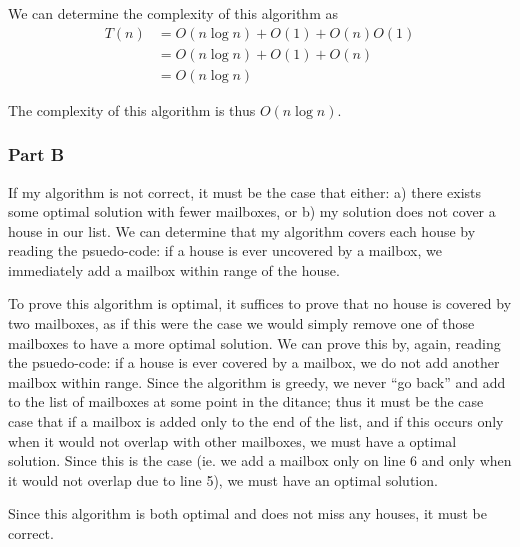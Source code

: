 \documentclass[12pt]{article}
\begin{document}
We can determine the complexity of this algorithm as
\begin{align*}
T(n) &= O(n\log n) + O(1) + O(n)O(1) \\
&= O(n\log n) + O(1) + O(n) \\
&= O(n\log n)
\end{align*}

The complexity of this algorithm is thus $O(n\log n)$.

\subsubsection*{Part B}
If my algorithm is not correct, it must be the case that either: a) there exists some optimal solution with fewer mailboxes, or b) my solution does not cover a house in our list. We can determine that my algorithm covers each house by reading the psuedo-code: if a house is ever uncovered by a mailbox, we immediately add a mailbox within range of the house.

To prove this algorithm is optimal, it suffices to prove that no house is covered by two mailboxes, as if this were the case we would simply remove one of those mailboxes to have a more optimal solution. We can prove this by, again, reading the psuedo-code: if a house is ever covered by a mailbox, we do not add another mailbox within range. Since the algorithm is greedy, we never ``go back'' and add to the list of mailboxes at some point in the ditance; thus it must be the case case that if a mailbox is added only to the end of the list, and if this occurs only when it would not overlap with other mailboxes, we must have a optimal solution. Since this is the case (ie. we add a mailbox only on line 6 and only when it would not overlap due to line 5), we must have an optimal solution.

Since this algorithm is both optimal and does not miss any houses, it must be correct.
\end{document}
